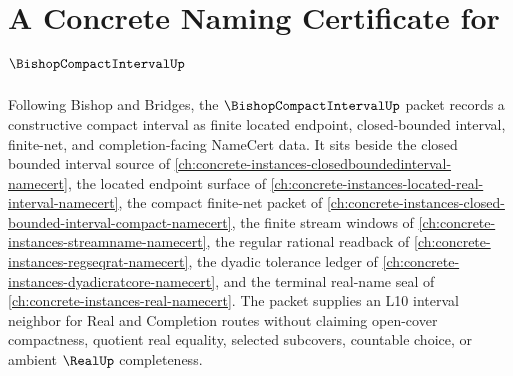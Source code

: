 \chapter{A Concrete Naming Certificate for $\BishopCompactIntervalUp$}
\label{ch:concrete-instances-bishop-compact-interval-namecert}

Following Bishop and Bridges, the $\BishopCompactIntervalUp$ packet records a constructive compact interval as finite located endpoint, closed-bounded interval, finite-net, and completion-facing NameCert data. It sits beside the closed bounded interval source of \autoref{ch:concrete-instances-closedboundedinterval-namecert}, the located endpoint surface of \autoref{ch:concrete-instances-located-real-interval-namecert}, the compact finite-net packet of \autoref{ch:concrete-instances-closed-bounded-interval-compact-namecert}, the finite stream windows of \autoref{ch:concrete-instances-streamname-namecert}, the regular rational readback of \autoref{ch:concrete-instances-regseqrat-namecert}, the dyadic tolerance ledger of \autoref{ch:concrete-instances-dyadicratcore-namecert}, and the terminal real-name seal of \autoref{ch:concrete-instances-real-namecert}. The packet supplies an L10 interval neighbor for Real and Completion routes without claiming open-cover compactness, quotient real equality, selected subcovers, countable choice, or ambient $\RealUp$ completeness.


